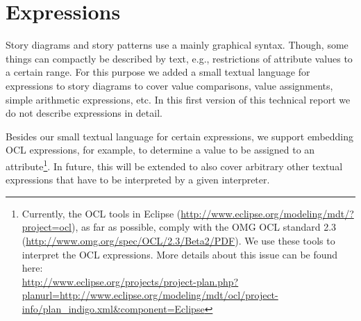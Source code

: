 \section{Expressions} \label{sec:Expressions}

Story diagrams and story patterns use a mainly graphical syntax.
Though, some things can compactly be described by text, e.g., restrictions of attribute values to a certain range.
For this purpose we added a small textual language for expressions to story diagrams
to cover value comparisons, value assignments, simple arithmetic expressions, etc.
In this first version of this technical report we do not describe expressions in detail.

Besides our small textual language for certain expressions, we support embedding OCL expressions, for example, to determine a value to be assigned to an attribute\footnote{Currently,
the OCL tools in Eclipse (\href{http://www.eclipse.org/modeling/mdt/?project=ocl}{http://www.eclipse.org/modeling/mdt/?project=ocl}),
as far as possible, comply with the OMG OCL standard 2.3 (\href{http://www.omg.org/spec/OCL/2.3/Beta2/PDF}{http://www.omg.org/spec/OCL/2.3/Beta2/PDF}).
We use these tools to interpret the OCL expressions.
More details about this issue can be found here:\\ \href{http://www.eclipse.org/projects/project-plan.php?planurl=http://www.eclipse.org/modeling/mdt/ocl/project-info/plan_indigo.xml&component=Eclipse}{http://www.eclipse.org/projects/project-plan.php?planurl=http://www.eclipse.org/modeling/mdt/ocl/project-info/plan\_indigo.xml\&component=Eclipse}}.
In future, this will be extended to also cover arbitrary other textual expressions that have to be interpreted by a given interpreter.

